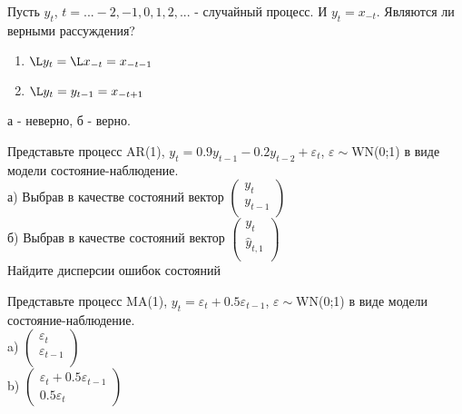 \begin{problem}
Пусть $y_{t}$, $t=...-2,-1,0,1,2,...$ - случайный процесс. И $y_{t}=x_{-t}$. Являются ли верными рассуждения?
\begin{enumerate}
\item $\L y_{t}=\L x_{-t}=x_{-t-1}$
\item $\L y_{t}=y_{t-1}=x_{-t+1}$ 
\end{enumerate}
\end{problem}

\begin{solution}
а - неверно, б - верно. 
\end{solution}





\begin{problem}
Представьте процесс AR(1),
$y_{t}=0.9y_{t-1}-0.2y_{t-2}+\varepsilon_{t}$,
$\varepsilon\sim$WN(0;1) в виде модели состояние-наблюдение. \\
а) Выбрав в качестве состояний вектор $\left(%
\begin{array}{c}
  y_{t} \\
  y_{t-1} \\
\end{array}%
\right)$ \\
б) Выбрав в качестве состояний вектор $\left(%
\begin{array}{c}
  y_{t} \\
  \hat{y}_{t,1} \\
\end{array}%
\right)$ \\
Найдите дисперсии ошибок состояний 
\end{problem}

\begin{solution}
\end{solution}

\begin{problem}
Представьте процесс MA(1),
$y_{t}=\varepsilon_{t}+0.5\varepsilon_{t-1}$,
$\varepsilon\sim$WN(0;1) в виде модели состояние-наблюдение. \\
a) $\left(%
\begin{array}{c}
  \varepsilon_{t} \\
  \varepsilon_{t-1} \\
\end{array}%
\right)$ \\
b) $\left(%
\begin{array}{c}
  \varepsilon_{t}+0.5\varepsilon_{t-1} \\
  0.5\varepsilon_{t} 
\end{array}%
\right)$ 
\end{problem}


